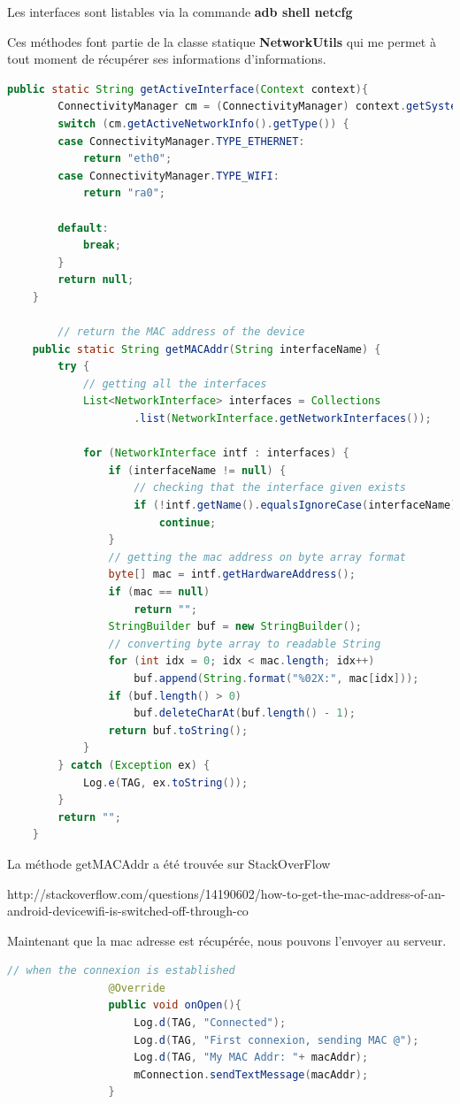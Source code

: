 Les interfaces sont listables via la commande \textbf{adb shell netcfg}

\medskip

Ces méthodes font partie de la classe statique \textbf{NetworkUtils} qui me permet à tout moment de récupérer ses informations d'informations.

\begin{lstlisting}[language=Java, caption={Network Utils}]
public static String getActiveInterface(Context context){
		ConnectivityManager cm = (ConnectivityManager) context.getSystemService(Context.CONNECTIVITY_SERVICE);
		switch (cm.getActiveNetworkInfo().getType()) {
		case ConnectivityManager.TYPE_ETHERNET:
			return "eth0";
		case ConnectivityManager.TYPE_WIFI:
			return "ra0";

		default:
			break;
		}
		return null;
	}
	
		// return the MAC address of the device
	public static String getMACAddr(String interfaceName) {
		try {
			// getting all the interfaces
			List<NetworkInterface> interfaces = Collections
					.list(NetworkInterface.getNetworkInterfaces());
			
			for (NetworkInterface intf : interfaces) {
				if (interfaceName != null) {
					// checking that the interface given exists
					if (!intf.getName().equalsIgnoreCase(interfaceName))
						continue;
				}
				// getting the mac address on byte array format
				byte[] mac = intf.getHardwareAddress();
				if (mac == null)
					return "";
				StringBuilder buf = new StringBuilder();
				// converting byte array to readable String
				for (int idx = 0; idx < mac.length; idx++)
					buf.append(String.format("%02X:", mac[idx]));
				if (buf.length() > 0)
					buf.deleteCharAt(buf.length() - 1);
				return buf.toString();
			}
		} catch (Exception ex) {
			Log.e(TAG, ex.toString());
		}
		return "";
	}
\end{lstlisting}
La méthode getMACAddr a été trouvée sur StackOverFlow

http://stackoverflow.com/questions/14190602/how-to-get-the-mac-address-of-an-android-devicewifi-is-switched-off-through-co

\medskip

Maintenant que la mac adresse est récupérée, nous pouvons l'envoyer au serveur.

\begin{lstlisting}[language=Java, caption={Envoi de la mac adresse au serveur}]
// when the connexion is established
				@Override
				public void onOpen(){
					Log.d(TAG, "Connected");
					Log.d(TAG, "First connexion, sending MAC @");
					Log.d(TAG, "My MAC Addr: "+ macAddr);
					mConnection.sendTextMessage(macAddr);
				}
\end{lstlisting}
